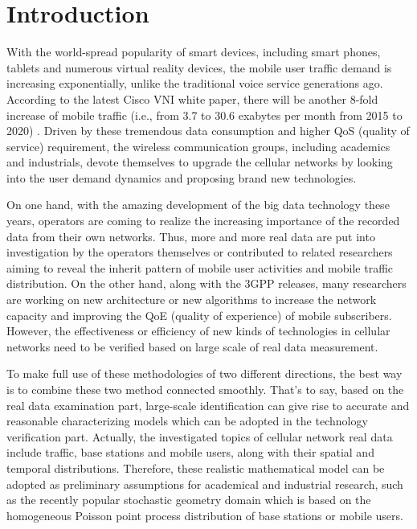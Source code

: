 
\chapter{Introduction} %

\label{Chapter1} %




With the world-spread popularity of smart devices, including smart phones, tablets and numerous virtual reality devices, the mobile user traffic demand is increasing exponentially, unlike the traditional voice service generations ago. According to the latest Cisco VNI white paper, there will be another 8-fold increase of mobile traffic (i.e., from 3.7 to 30.6 exabytes per month from 2015 to 2020) \cite{vni2016}. Driven by these tremendous data consumption and higher QoS (quality of service) requirement, the wireless communication groups, including academics and industrials, devote themselves to upgrade the cellular networks by looking into the user demand dynamics and proposing brand new technologies.

On one hand, with the amazing development of the big data technology these years, operators are coming to realize the increasing importance of the recorded data from their own networks. Thus, more and more real data are put into investigation by the operators themselves or contributed to related researchers aiming to reveal the inherit pattern of mobile user activities and mobile traffic distribution. On the other hand, along with the 3GPP releases, many researchers are working on new architecture or new algorithms to increase the network capacity and improving the QoE (quality of experience) of mobile subscribers. However, the effectiveness or efficiency of new kinds of technologies in cellular networks need to be verified based on large scale of real data measurement.

To make full use of these methodologies of two different directions, the best way is to combine these two method connected smoothly. That's to say, based on the real data examination part, large-scale identification can give rise to accurate and reasonable characterizing models which can be adopted in the technology verification part. Actually, the investigated topics of cellular network real data include traffic, base stations and mobile users, along with their spatial and temporal distributions. Therefore, these realistic mathematical model can be adopted as preliminary assumptions for academical and industrial research, such as the recently popular stochastic geometry domain which is based on the homogeneous Poisson point process distribution of base stations or mobile users.

